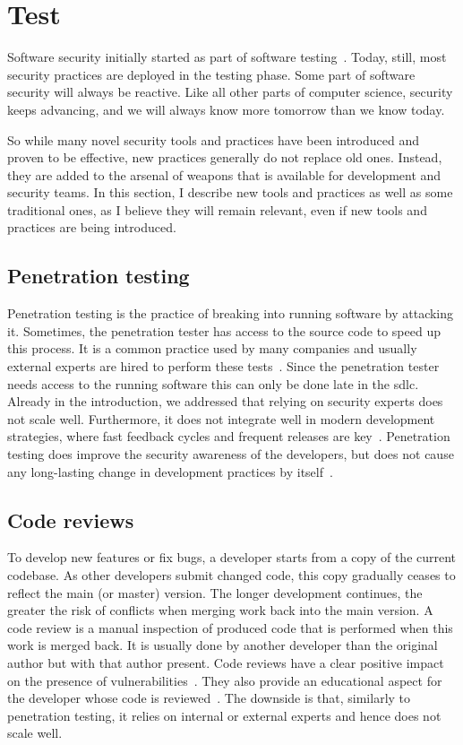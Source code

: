 \section{Test}
\label{sec:related-test}

Software security initially started as part of software testing~\cite{sharma2017}.
Today, still, most security practices are deployed in the testing phase.
Some part of software security will always be reactive.
Like all other parts of computer science, security keeps advancing, and we will always know more tomorrow than we know today.

So while many novel security tools and practices have been introduced and proven to be effective, new practices generally do not replace old ones.
Instead, they are added to the arsenal of weapons that is available for development and security teams.
In this section, I describe new tools and practices as well as some traditional ones, as I believe they will remain relevant, even if new tools and practices are being introduced.

\subsection{Penetration testing}
Penetration testing is the practice of breaking into running software by attacking it.
Sometimes, the penetration tester has access to the source code to speed up this process.
It is a common practice used by many companies and usually external experts are hired to perform these tests~\cite{cruzes2017security,bsimm11}.
Since the penetration tester needs access to the running software this can only be done late in the \gls{sdlc}.
Already in the introduction, we addressed that relying on security experts does not scale well.
Furthermore, it does not integrate well in modern development strategies, where fast feedback cycles and frequent releases are key~\cite{securitytestingagile}.
Penetration testing does improve the security awareness of the developers, but does not cause any long-lasting change in development practices by itself~\cite{turpe2016penetration}.

\subsection{Code reviews}
To develop new features or fix bugs, a developer starts from a copy of the current codebase.
As other developers submit changed code, this copy gradually ceases to reflect the main (or master) version.
The longer development continues, the greater the risk of conflicts when merging work back into the main version.
A code review is a manual inspection of produced code that is performed when this work is merged back.
It is usually done by another developer than the original author but with that author present.
Code reviews have a clear positive impact on the presence of vulnerabilities~\cite{votipka2020understanding}.
They also provide an educational aspect for the developer whose code is reviewed~\cite{futcher2008guidelines}.
The downside is that, similarly to penetration testing, it relies on internal or external experts and hence does not scale well.

